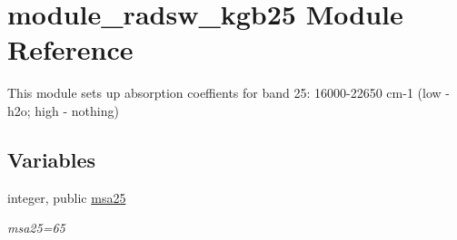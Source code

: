 \hypertarget{namespacemodule__radsw__kgb25}{}\section{module\+\_\+radsw\+\_\+kgb25 Module Reference}
\label{namespacemodule__radsw__kgb25}


This module sets up absorption coeffients for band 25\+: 16000-\/22650 cm-\/1 (low -\/ h2o; high -\/ nothing)  


\subsection*{Variables}
\begin{DoxyCompactItemize}
\item 
\mbox{\label{namespacemodule__radsw__kgb25_afc06df1f3c3a0b2f3189424ed042973e}} 
integer, public \hyperlink{namespacemodule__radsw__kgb25_afc06df1f3c3a0b2f3189424ed042973e}{msa25}
\begin{DoxyCompactList}\small\item\em msa25=65 \end{DoxyCompactList}\end{DoxyCompactItemize}

